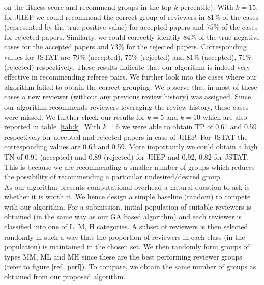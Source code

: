 on the fitness score and recommend groups in the top $k$ percentile). 
With $k = 15$, for JHEP we could recommend the correct group of reviewers in $81\%$ 
of the cases (represented by the true positive value) for accepted papers and $75\%$ of the cases for rejected papers. Similarly, we could correctly identify $84\%$ of the true negative cases for the accepted papers and $73\%$ for the rejected papers. Corresponding values for JSTAT are 
$79\%$ (accepted), $75\%$ (rejected) and $81\%$ (accepted), $71\%$ (rejected) respectively. %
These results indicate that our algorithm is indeed very effective in recommending referee pairs. We further look into the cases where 
our algorithm failed to obtain the correct grouping. We observe that in most of these cases a new reviewer (without any previous review history) was assigned. 
Since our algorithm recommends reviewers leveraging the review history, these cases were missed.
We further check our results for $k=5$ and $k=10$ which are also reported in 
table~\ref{tab:k}. With $k=5$ we were able to obtain TP of 0.61 and 0.59 respectively for accepted and rejected papers in case of JHEP. For JSTAT the corresponding values 
are 0.63 and 0.59. More importantly we could obtain a high TN of 0.91 (accepted) and 0.89 (rejected) for JHEP and 0.92, 0.82 for JSTAT. This is because we are 
recommending a smaller number of groups which reduces the possibility of recommending a particular undesired/desired group.\\
As our algorithm presents computational overhead a natural question to ask is whether it is worth it. We hence design a simple 
baseline (random) to compete with our algorithm. For a submission, initial population of suitable reviewers is obtained (in the same way as our GA based algorithm) and each reviewer is classified into one of L, M, H categories. A subset of reviewers is then selected randomly in such a way that the proportion of reviewers in each class (in the population) is maintained 
in the chosen set. 
We then randomly form groups of types MM, ML and MH since these are the best performing reviewer groups (refer to figure \ref{ref_perf}).  
To compare, we obtain the same number of groups as obtained from our proposed algorithm. 
